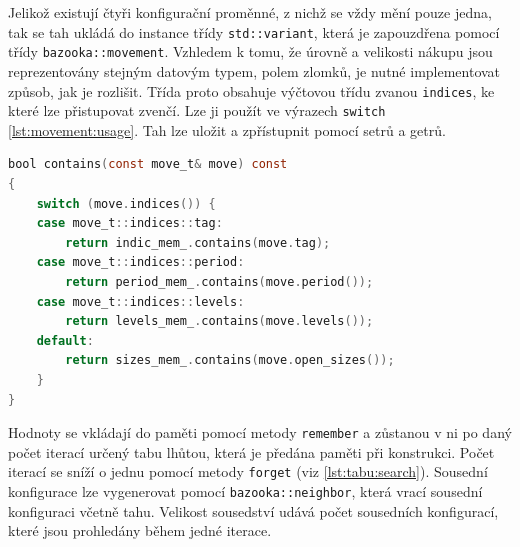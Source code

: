 Jelikož existují čtyři konfigurační proměnné, z nichž se vždy mění pouze jedna, tak se tah ukládá do instance třídy \texttt{std::variant}, která je zapouzdřena pomocí třídy \texttt{bazooka::movement}.
Vzhledem k tomu, že úrovně a velikosti nákupu jsou reprezentovány stejným datovým typem, polem zlomků, je nutné implementovat způsob, jak je rozlišit.
Třída proto obsahuje výčtovou třídu zvanou \texttt{indices}, ke které lze přistupovat zvenčí.
Lze ji použít ve výrazech \texttt{switch} \ref{lst:movement:usage}.
Tah lze uložit a zpřístupnit pomocí setrů a getrů.

\begin{lstlisting}[caption={~Použití třídy \texttt{bazooka::movement}},label={lst:movement:usage},captionpos=t,abovecaptionskip=-\medskipamount,belowcaptionskip=\medskipamount,language=C]
bool contains(const move_t& move) const
{
    switch (move.indices()) {
    case move_t::indices::tag:
        return indic_mem_.contains(move.tag);
    case move_t::indices::period:
        return period_mem_.contains(move.period());
    case move_t::indices::levels:
        return levels_mem_.contains(move.levels());
    default:
        return sizes_mem_.contains(move.open_sizes());
    }
}
\end{lstlisting}

Hodnoty se vkládají do paměti pomocí metody \texttt{remember} a zůstanou v ni  po daný počet iterací určený 
tabu lhůtou, která je předána paměti při konstrukci.
Počet iterací se sníží o jednu pomocí metody \texttt{forget} (viz \ref{lst:tabu:search}).
Sousední konfigurace lze vygenerovat pomocí \texttt{bazooka::neighbor}, která vrací sousední konfiguraci včetně tahu.
Velikost sousedství udává počet sousedních konfigurací, které jsou prohledány během jedné iterace.

